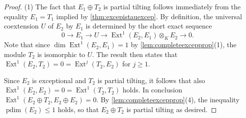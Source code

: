 \documentclass[10pt,twoside, a4paper,reqno]{amsart}
\DeclareMathOperator{\Ext}{Ext}
\DeclareMathOperator{\projdim}{pdim}
\theoremstyle{definition}
\begin{document}
\begin{proof}
    (1) The fact that $E_1 \oplus T_2$ is partial tilting follows immediately from the equality $E_1=T_1$ implied by \cref{thm:excepistauexcep}. By definition, the universal coextension $U$ of $E_2$ by $E_1$ is determined by the short exact sequence
    \[ 0 \to E_1 \to U \to \Ext^1(E_2, E_1) \otimes_K E_2 \to 0. \]
    Note that since $\dim \Ext^1(E_2, E_1) = 1$ by \cref{lem:completeexcepprop}(1), the module $T_2$ is isomorphic to $U$. The result \cite[Lem. 3.2(a)]{HillePerling2014} then states that $\Ext^1(E_2, T_2)= 0 = \Ext^j(T_2, E_2)$ for $j \geq 1$. 
    
    Since $E_2$ is exceptional and $T_2$ is partial tilting, it follows that also $\Ext^1(E_2, E_2) = 0 = \Ext^1(T_2, T_2) $ holds. In conclusion $\Ext^1(E_2 \oplus T_2, E_2 \oplus E_2) = 0$. By \cref{lem:completeexcepprop}(4), the inequality $\projdim(E_2) \leq 1$ holds, so that $E_2 \oplus T_2$ is partial tilting as desired.


\end{proof}
\end{document}
